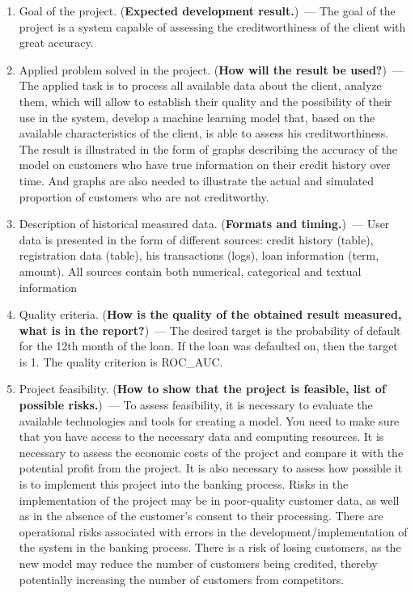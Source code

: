 \documentclass[12pt]{article}
\begin{document}
\begin{enumerate}
\item Goal of the project. (\textbf{Expected development result.})~--- The goal of the project is a system capable of assessing the creditworthiness of the client with great accuracy.
\item Applied problem solved in the project. (\textbf{How will the result be used?})~--- The applied task is to process all available data about the client, analyze them, which will allow to establish their quality and the possibility of their use in the system, develop a machine learning model that, based on the available characteristics of the client, is able to assess his creditworthiness.  The result is illustrated in the form of graphs describing the accuracy of the model on customers who have true information on their credit history over time. And graphs are also needed to illustrate the actual and simulated proportion of customers who are not creditworthy. 
\item Description of historical measured data. (\textbf{Formats and timing.})~--- User data is presented in the form of different sources: credit history (table), registration data (table), his transactions (logs), loan information (term, amount). All sources contain both numerical, categorical and textual information 
\item Quality criteria. (\textbf{How is the quality of the obtained result measured, what is in the report?})~--- The desired target is the probability of default for the 12th month of the loan. If the loan was defaulted on, then the target is 1. The quality criterion is ROC\_AUC. 
\item Project feasibility. (\textbf{How to show that the project is feasible, list of possible risks.})~--- To assess feasibility, it is necessary to evaluate the available technologies and tools for creating a model. You need to make sure that you have access to the necessary data and computing resources. It is necessary to assess the economic costs of the project and compare it with the potential profit from the project. It is also necessary to assess how possible it is to implement this project into the banking process. Risks in the implementation of the project may be in poor-quality customer data, as well as in the absence of the customer's consent to their processing. There are operational risks associated with errors in the development/implementation of the system in the banking process. There is a risk of losing customers, as the new model may reduce the number of customers being credited, thereby potentially increasing the number of customers from competitors. 

\end{enumerate}
\end{document}
